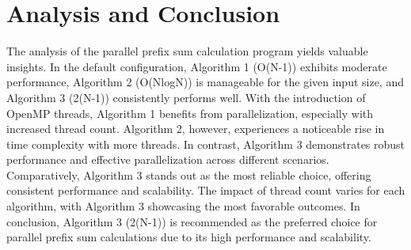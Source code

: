 \documentclass[11pt, twocolumn]{article}
\begin{document}
\section{Analysis and Conclusion}The analysis of the parallel prefix sum calculation program yields valuable insights. In the default configuration, Algorithm 1 (O(N-1)) exhibits moderate performance, Algorithm 2 (O(NlogN)) is manageable for the given input size, and Algorithm 3 (2(N-1)) consistently performs well. With the introduction of OpenMP threads, Algorithm 1 benefits from parallelization, especially with increased thread count. Algorithm 2, however, experiences a noticeable rise in time complexity with more threads. In contrast, Algorithm 3 demonstrates robust performance and effective parallelization across different scenarios. Comparatively, Algorithm 3 stands out as the most reliable choice, offering consistent performance and scalability. The impact of thread count varies for each algorithm, with Algorithm 3 showcasing the most favorable outcomes. In conclusion, Algorithm 3 (2(N-1)) is recommended as the preferred choice for parallel prefix sum calculations due to its high performance and scalability.
\end{document}
